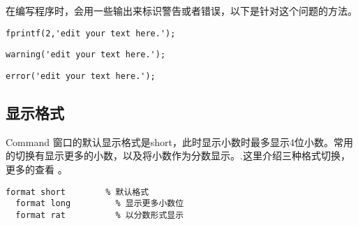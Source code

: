 在编写程序时，会用一些输出来标识警告或者错误，以下是针对这个问题的方法。

\vspace{-0.8cm}
\begin{lstlisting}[caption = 红色字符串输出]
fprintf(2,'edit your text here.');
\end{lstlisting}


\vspace{-0.8cm}
\begin{lstlisting}[caption = 警告输出]
warning('edit your text here.');
\end{lstlisting}

\vspace{-0.8cm}
\begin{lstlisting}[caption = 错误输出]
error('edit your text here.');
\end{lstlisting}






\subsection{显示格式}

Command 窗口的默认显示格式是short，此时显示小数时最多显示4位小数。常用的切换有显示更多的小数，以及将小数作为分数显示。.这里介绍三种格式切换，更多的查看 。

\vspace{-0.8cm}
\begin{lstlisting}[caption = Command窗口显示格式]
  format short        % 默认格式
  format long         % 显示更多小数位
  format rat          % 以分数形式显示
\end{lstlisting}